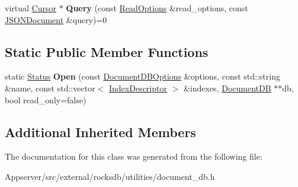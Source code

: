 \begin{DoxyCompactItemize}
\item 
virtual \hyperlink{classrocksdb_1_1Cursor}{Cursor} $\ast$ {\bfseries Query} (const \hyperlink{structrocksdb_1_1ReadOptions}{Read\+Options} \&read\+\_\+options, const \hyperlink{classrocksdb_1_1JSONDocument}{J\+S\+O\+N\+Document} \&query)=0\hypertarget{classrocksdb_1_1DocumentDB_a584dc4f0db8065f8d1c94563a80cd559}{}\label{classrocksdb_1_1DocumentDB_a584dc4f0db8065f8d1c94563a80cd559}

\end{DoxyCompactItemize}
\subsection*{Static Public Member Functions}
\begin{DoxyCompactItemize}
\item 
static \hyperlink{classrocksdb_1_1Status}{Status} {\bfseries Open} (const \hyperlink{structrocksdb_1_1DocumentDBOptions}{Document\+D\+B\+Options} \&options, const std\+::string \&name, const std\+::vector$<$ \hyperlink{structrocksdb_1_1DocumentDB_1_1IndexDescriptor}{Index\+Descriptor} $>$ \&indexes, \hyperlink{classrocksdb_1_1DocumentDB}{Document\+DB} $\ast$$\ast$db, bool read\+\_\+only=false)\hypertarget{classrocksdb_1_1DocumentDB_abd15334b981a303969cb16e6f152c69f}{}\label{classrocksdb_1_1DocumentDB_abd15334b981a303969cb16e6f152c69f}

\end{DoxyCompactItemize}
\subsection*{Additional Inherited Members}


The documentation for this class was generated from the following file\+:\begin{DoxyCompactItemize}
\item 
Appserver/src/external/rocksdb/utilities/document\+\_\+db.\+h\end{DoxyCompactItemize}
